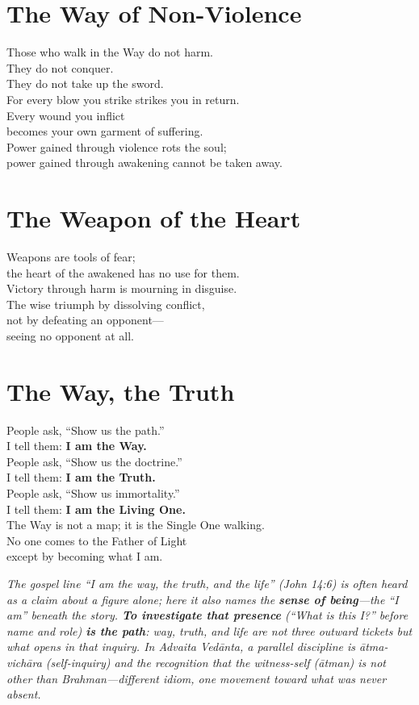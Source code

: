 \documentclass[10pt, openright]{book}
\begin{document}
\section{The Way of Non-Violence}
Those who walk in the Way do not harm. \\
They do not conquer. \\
They do not take up the sword. \\

For every blow you strike strikes you in return. \\
Every wound you inflict \\
becomes your own garment of suffering. \\

Power gained through violence rots the soul; \\
power gained through awakening cannot be taken away.

\section{The Weapon of the Heart}
Weapons are tools of fear; \\
the heart of the awakened has no use for them. \\
Victory through harm is mourning in disguise. \\

The wise triumph by dissolving conflict, \\
not by defeating an opponent— \\
seeing no opponent at all.

\section{The Way, the Truth}
People ask, ``Show us the path.'' \\
I tell them: \textbf{I am the Way.} \\
People ask, ``Show us the doctrine.'' \\
I tell them: \textbf{I am the Truth.} \\
People ask, ``Show us immortality.'' \\
I tell them: \textbf{I am the Living One.} \\

The Way is not a map; it is the Single One walking. \\
No one comes to the Father of Light \\
except by becoming what I am.

\noindent\textit{The gospel line ``I am the way, the truth, and the life'' (John 14:6) is often heard as a claim about a figure alone; here it also names the \textbf{sense of being}---the ``I am'' beneath the story. \textbf{To investigate that presence} (``What is this I?'' before name and role) \textbf{is the path}: way, truth, and life are not three outward tickets but what opens in that inquiry. In Advaita Vedānta, a parallel discipline is \emph{ātma-vichāra} (self-inquiry) and the recognition that the witness-self (\emph{ātman}) is not other than \emph{Brahman}---different idiom, one movement toward what was never absent.}
\end{document}
